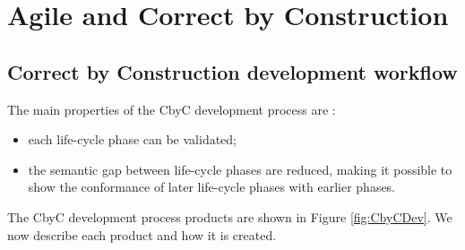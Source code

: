 
\chapter{Agile and Correct by Construction} %

\label{Chapter 2} %

\section{Correct by Construction development workflow}\label{CbyCDevWorkflow}

The main properties of the CbyC development process are  \parencite{Tokeneer}:
\begin{itemize}
	\item each life-cycle phase can be validated;
	\item the semantic gap between life-cycle phases are reduced, making it possible
		to show the conformance of later life-cycle phases with earlier phases.
\end{itemize}

The CbyC development process products are shown in Figure \ref{fig:CbyCDev}. We now describe each product and how it is created.

